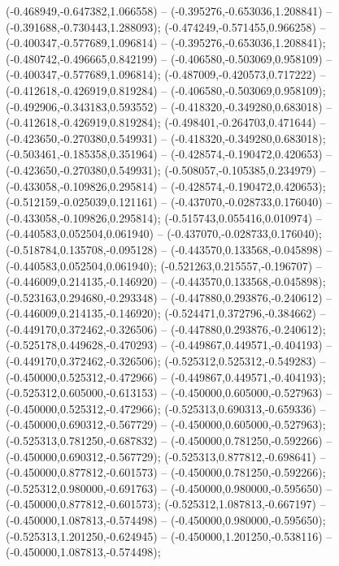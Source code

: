  (-0.468949,-0.647382,1.066558) -- (-0.395276,-0.653036,1.208841) -- (-0.391688,-0.730443,1.288093);
 (-0.474249,-0.571455,0.966258) -- (-0.400347,-0.577689,1.096814) -- (-0.395276,-0.653036,1.208841);
 (-0.480742,-0.496665,0.842199) -- (-0.406580,-0.503069,0.958109) -- (-0.400347,-0.577689,1.096814);
 (-0.487009,-0.420573,0.717222) -- (-0.412618,-0.426919,0.819284) -- (-0.406580,-0.503069,0.958109);
 (-0.492906,-0.343183,0.593552) -- (-0.418320,-0.349280,0.683018) -- (-0.412618,-0.426919,0.819284);
 (-0.498401,-0.264703,0.471644) -- (-0.423650,-0.270380,0.549931) -- (-0.418320,-0.349280,0.683018);
 (-0.503461,-0.185358,0.351964) -- (-0.428574,-0.190472,0.420653) -- (-0.423650,-0.270380,0.549931);
 (-0.508057,-0.105385,0.234979) -- (-0.433058,-0.109826,0.295814) -- (-0.428574,-0.190472,0.420653);
 (-0.512159,-0.025039,0.121161) -- (-0.437070,-0.028733,0.176040) -- (-0.433058,-0.109826,0.295814);
 (-0.515743,0.055416,0.010974) -- (-0.440583,0.052504,0.061940) -- (-0.437070,-0.028733,0.176040);
 (-0.518784,0.135708,-0.095128) -- (-0.443570,0.133568,-0.045898) -- (-0.440583,0.052504,0.061940);
 (-0.521263,0.215557,-0.196707) -- (-0.446009,0.214135,-0.146920) -- (-0.443570,0.133568,-0.045898);
 (-0.523163,0.294680,-0.293348) -- (-0.447880,0.293876,-0.240612) -- (-0.446009,0.214135,-0.146920);
 (-0.524471,0.372796,-0.384662) -- (-0.449170,0.372462,-0.326506) -- (-0.447880,0.293876,-0.240612);
 (-0.525178,0.449628,-0.470293) -- (-0.449867,0.449571,-0.404193) -- (-0.449170,0.372462,-0.326506);
 (-0.525312,0.525312,-0.549283) -- (-0.450000,0.525312,-0.472966) -- (-0.449867,0.449571,-0.404193);
 (-0.525312,0.605000,-0.613153) -- (-0.450000,0.605000,-0.527963) -- (-0.450000,0.525312,-0.472966);
 (-0.525313,0.690313,-0.659336) -- (-0.450000,0.690312,-0.567729) -- (-0.450000,0.605000,-0.527963);
 (-0.525313,0.781250,-0.687832) -- (-0.450000,0.781250,-0.592266) -- (-0.450000,0.690312,-0.567729);
 (-0.525313,0.877812,-0.698641) -- (-0.450000,0.877812,-0.601573) -- (-0.450000,0.781250,-0.592266);
 (-0.525312,0.980000,-0.691763) -- (-0.450000,0.980000,-0.595650) -- (-0.450000,0.877812,-0.601573);
 (-0.525312,1.087813,-0.667197) -- (-0.450000,1.087813,-0.574498) -- (-0.450000,0.980000,-0.595650);
 (-0.525313,1.201250,-0.624945) -- (-0.450000,1.201250,-0.538116) -- (-0.450000,1.087813,-0.574498);
